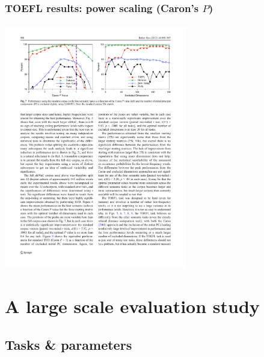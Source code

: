 \documentclass[t]{beamer} %
\begin{document}
\begin{frame}
  \frametitle{TOEFL results: power scaling (Caron's $P$)}
  \framesubtitle{\citep[p.~900, Fig.~7]{Bullinaria:Levy:12}}

  \ungap[1.5]
  \begin{center}
    \includegraphics[width=8cm]{img/BullinariaLevy2012_p900_fig7_power}
  \end{center}

  \ungap[.5]
\end{frame}



\section{A large scale evaluation study}

\begin{frame}[c]
  \centering

  
  \gap[2]
  \citep{Lapesa:Evert:14a}
\end{frame}

\subsection{Tasks \& parameters}
\end{document}
